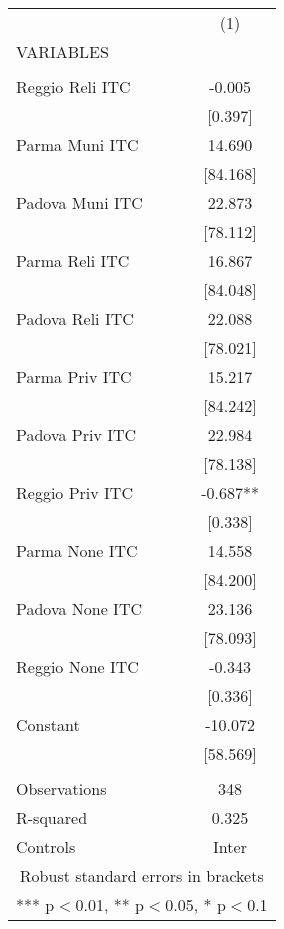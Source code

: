 \begin{tabular}{lc} \hline
 & (1) \\
VARIABLES &  \\ \hline
 &  \\
Reggio Reli ITC & -0.005 \\
 & [0.397] \\
Parma Muni ITC & 14.690 \\
 & [84.168] \\
Padova Muni ITC & 22.873 \\
 & [78.112] \\
Parma Reli ITC & 16.867 \\
 & [84.048] \\
Padova Reli ITC & 22.088 \\
 & [78.021] \\
Parma Priv ITC & 15.217 \\
 & [84.242] \\
Padova Priv ITC & 22.984 \\
 & [78.138] \\
Reggio Priv ITC & -0.687** \\
 & [0.338] \\
Parma None ITC & 14.558 \\
 & [84.200] \\
Padova None ITC & 23.136 \\
 & [78.093] \\
Reggio None ITC & -0.343 \\
 & [0.336] \\
Constant & -10.072 \\
 & [58.569] \\
 &  \\
Observations & 348 \\
R-squared & 0.325 \\
 Controls & Inter \\ \hline
\multicolumn{2}{c}{ Robust standard errors in brackets} \\
\multicolumn{2}{c}{ *** p$<$0.01, ** p$<$0.05, * p$<$0.1} \\
\end{tabular}
